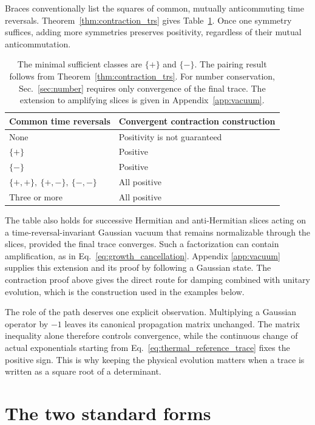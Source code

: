 \documentclass[11pt,a4paper]{article}
\numberwithin{equation}{section}
\begin{document}
Braces conventionally list the squares of common, mutually anticommuting
time reversals. Theorem~\ref{thm:contraction_trs} gives
Table~\ref{tab:trs}. Once one symmetry suffices, adding more symmetries
preserves positivity, regardless of their mutual anticommutation.
\begin{table}[ht]
 \centering
 \begin{tabular}{ll}
 \toprule
 Common time reversals & Convergent contraction construction\\
 \midrule
 None & Positivity is not guaranteed\\
 $\{+\}$ & Positive\\
 $\{-\}$ & Positive\\
 $\{+,+\},\ \{+,-\},\ \{-,-\}$ & All positive\\
 Three or more & All positive\\
 \bottomrule
 \end{tabular}
 \caption{The minimal sufficient classes are $\{+\}$ and $\{-\}$.
 The pairing result follows from Theorem~\ref{thm:contraction_trs}.
 For number conservation, Sec.~\ref{sec:number} requires only convergence
 of the final trace. The extension to amplifying slices is given in
 Appendix~\ref{app:vacuum}.}
 \label{tab:trs}
\end{table}

The table also holds for successive Hermitian and anti-Hermitian slices
acting on a time-reversal-invariant Gaussian vacuum that remains
normalizable through the slices, provided the final trace converges.
Such a factorization can contain
amplification, as in Eq.~\eqref{eq:growth_cancellation}. Appendix
\ref{app:vacuum} supplies this extension and its proof by following a
Gaussian state. The contraction proof above gives the direct route for
damping combined with unitary evolution, which is the construction used
in the examples below.

The role of the path deserves one explicit observation. Multiplying a
Gaussian operator by $-1$ leaves its canonical propagation matrix
unchanged. The matrix inequality alone therefore controls convergence,
while the continuous change of actual exponentials starting from
Eq.~\eqref{eq:thermal_reference_trace} fixes the positive sign.
This is why keeping the physical evolution matters when a trace is
written as a square root of a determinant.

\section{The two standard forms}
\label{sec:standard}
\end{document}
